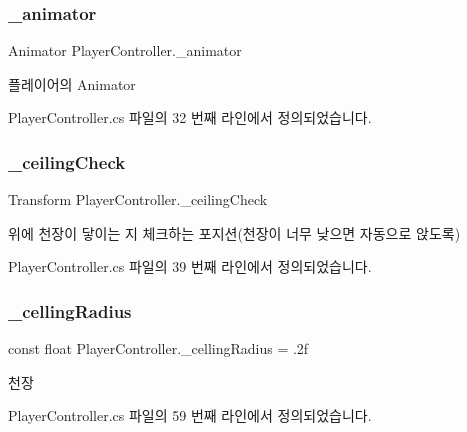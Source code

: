 \subsubsection{\texorpdfstring{\_animator}{\_animator}}
{\footnotesize\ttfamily Animator Player\+Controller.\+\_\+animator\hspace{0.3cm}{\ttfamily [private]}}



플레이어의 Animator 



Player\+Controller.\+cs 파일의 32 번째 라인에서 정의되었습니다.

\mbox{\label{class_player_controller_a932dbf6c5cc4527856596dc1f9df1426}} 
\subsubsection{\texorpdfstring{\_ceilingCheck}{\_ceilingCheck}}
{\footnotesize\ttfamily Transform Player\+Controller.\+\_\+ceiling\+Check\hspace{0.3cm}{\ttfamily [private]}}



위에 천장이 닿이는 지 체크하는 포지션(천장이 너무 낮으면 자동으로 앉도록) 



Player\+Controller.\+cs 파일의 39 번째 라인에서 정의되었습니다.

\mbox{\label{class_player_controller_a306070e77c6bcd09f4fed177c876684f}} 
\subsubsection{\texorpdfstring{\_cellingRadius}{\_cellingRadius}}
{\footnotesize\ttfamily const float Player\+Controller.\+\_\+celling\+Radius = .\+2f\hspace{0.3cm}{\ttfamily [private]}}



천장 



Player\+Controller.\+cs 파일의 59 번째 라인에서 정의되었습니다.


